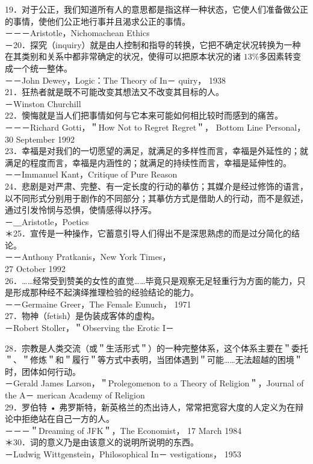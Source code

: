 19．对于公正，我们知道所有人的意思都是指这样一种状态，它使人们准备做公正的事情，使他们公正地行事并且渴求公正的事情。\\
－－－Aristotle，Nichomachean Ethics\\
－20．探究（inquiry）就是由人控制和指导的转换，它把不确定状况转换为一种在其类别和关系中都非常确定的状况，使得可以把原本状况的诸 $13 \%$多因素转变成一个统一整体。\\
－－John Dewey，Logic：The Theory of In－ quiry， 1938\\
21．狂热者就是既不可能改变其想法又不改变其目标的人。\\
－Winston Churchill\\
22．懊悔就是当人们把事情如何与它本来可能如何相比较时而感到的痛苦。\\
－－－Richard Gotti，＂How Not to Regret Regret＂， Bottom Line Personal， 30 September 1992\\
23．幸福是对我们的一切愿望的满足，就满足的多样性而言，幸福是外延性的；就满足的程度而言，幸福是内涵性的；就满足的持续性而言，幸福是延伸性的。\\
－－Immanuel Kant，Critique of Pure Reason\\
24．悲剧是对严肃、完整、有一定长度的行动的摹仿；其媒介是经过修饰的语言，以不同形式分别用于剧作的不同部分；其摹仿方式是借助人的行动，而不是叙述，通过引发怜悯与恐惧，使情感得以抒泻。\\
－＿Aristotle，Poetics\\
＊25．宣传是一种操作，它蓄意引导人们得出不是深思熟虑的而是过分简化的结论。\\
－－Anthony Pratkanis，New York Times，\\
27 October 1992\\
26．……经常受到赞美的女性的直觉……毕竟只是观察无足轻重行为方面的能力，只是形成那种经不起演绎推理检验的经验结论的能力。\\
－－Germaine Greer，The Female Eunuch， 1971\\
27．物神（fetish）是伪装成客体的虚构。\\
－Robert Stoller，＂Observing the Erotic I－

28．宗教是人类交流（或＂生活形式＂）的一种完整体系，这个体系主要在＂委托＂、＂修炼＂和＂履行＂等方式中表明，当团体遇到＂可能……无法超越的困境＂时，团体如何行动。\\
－Gerald James Larson，＂Prolegomenon to a Theory of Religion＂，Journal of the A－ merican Academy of Religion\\
29．罗伯特 • 弗罗斯特，新英格兰的杰出诗人，常常把宽容大度的人定义为在辩论中拒绝站在自己一方的人。\\
－－－＂Dreaming of JFK＂，The Economist， 17 March 1984\\
＊30．词的意义乃是由该意义的说明所说明的东西。\\
－Ludwig Wittgenstein，Philosophical In－ vestigations， 1953


